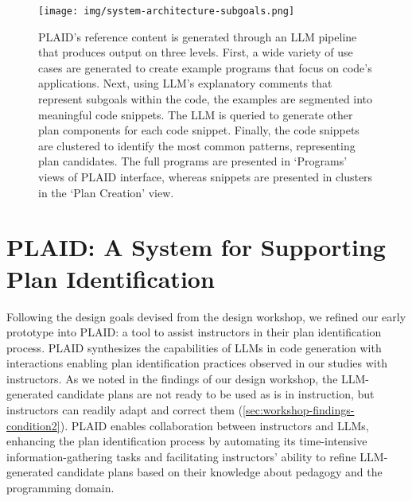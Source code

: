 




\begin{figure*}
    \centering
    \texttt{[image: img/system-architecture-subgoals.png]}
    \caption{PLAID's reference content is generated through an LLM pipeline
    that produces output on three levels.
    First, a wide variety of use cases are generated to create example programs that focus on code's applications. Next, using LLM's explanatory comments that represent subgoals within the code, the examples are segmented into meaningful code snippets. The LLM is queried to generate other plan components for each code snippet. Finally, the code snippets are clustered to identify the most common patterns, representing plan candidates. The full programs are presented in `Programs' views of PLAID interface, whereas snippets are presented in clusters in the `Plan Creation' view.}
    \label{fig:system-pipeline}
\end{figure*}
\section{PLAID: A System for Supporting Plan Identification}
\label{sec:system-design}

Following the design goals devised from the design workshop, we refined our early prototype into PLAID: a
tool to assist instructors in their plan identification process.
PLAID synthesizes the capabilities of LLMs in code generation with interactions enabling plan identification practices observed in our studies with instructors.
As we noted in the findings of our design workshop, the LLM-generated candidate plans are not ready to be used as is in instruction, but instructors can readily adapt and correct them (\cref{sec:workshop-findings-condition2}).
PLAID enables collaboration between instructors and LLMs, enhancing the plan identification process by automating its time-intensive information-gathering tasks and facilitating instructors' ability to refine LLM-generated candidate plans based on their knowledge about pedagogy and the programming domain. 



